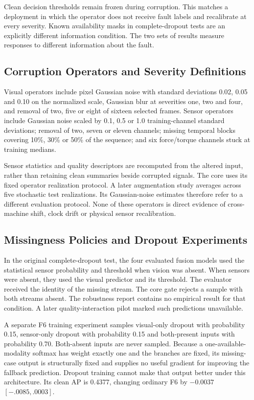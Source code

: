 Clean decision thresholds remain frozen during corruption. This matches a deployment in
which the operator does not receive fault labels and recalibrate at every severity.
Known availability masks in complete-dropout tests are an explicitly different
information condition. The two sets of results measure responses to different
information about the fault.

\subsection{Corruption Operators and Severity Definitions}
Visual operators include pixel Gaussian noise with standard deviations 0.02, 0.05 and
0.10 on the normalized scale, Gaussian blur at severities one, two and four, and removal
of two, five or eight of sixteen selected frames. Sensor operators include Gaussian
noise scaled by 0.1, 0.5 or 1.0 training-channel standard deviations; removal of two,
seven or eleven channels; missing temporal blocks covering 10\%, 30\% or 50\% of the
sequence; and six force/torque channels stuck at training medians.

Sensor statistics and quality descriptors are recomputed from the altered input, rather
than retaining clean summaries beside corrupted signals. The core uses its fixed
operator realization protocol. A later augmentation study averages across five
stochastic test realizations. Its Gaussian-noise estimates therefore refer to a
different evaluation protocol. None of these operators is direct evidence of
cross-machine shift, clock drift or physical sensor recalibration.

\subsection{Missingness Policies and Dropout Experiments}
In the original complete-dropout test, the four evaluated fusion models used the
statistical sensor probability and threshold when vision was absent. When sensors were
absent, they used the visual predictor and its threshold. The evaluator received the
identity of the missing stream. The core gate rejects a sample with both streams absent.
The robustness report contains no empirical result for that condition. A later
quality-interaction pilot marked such predictions unavailable.

A separate F6 training experiment samples visual-only dropout with probability 0.15,
sensor-only dropout with probability 0.15 and both-present inputs with probability 0.70.
Both-absent inputs are never sampled. Because a one-available-modality softmax has
weight exactly one and the branches are fixed, its missing-case output is structurally
fixed and supplies no useful gradient for improving the fallback prediction. Dropout
training cannot make that output better under this architecture. Its clean AP is 0.4377,
changing ordinary F6 by $-0.0037$ $[-.0085,.0003]$.


